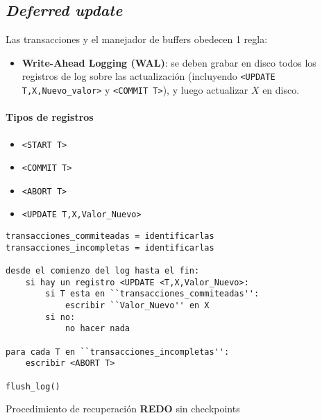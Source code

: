 \documentclass[a4paper, twoside]{article}
\begin{document}
\subsection{\emph{Deferred update}}
Las transacciones y el manejador de buffers obedecen 1 regla:
\begin{itemize}
	\item \textbf{Write-Ahead Logging (WAL)}: se deben grabar en disco todos los registros de log sobre las actualización (incluyendo \texttt{<UPDATE T,X,Nuevo\_valor>} y \texttt{<COMMIT T>}), y luego actualizar $X$ en disco.
\end{itemize}

\paragraph{Tipos de registros}
\begin{itemize}
	\item \texttt{<START T>}
	\item \texttt{<COMMIT T>}
	\item \texttt{<ABORT T>}
	\item \texttt{<UPDATE T,X,Valor\_Nuevo>}
\end{itemize}

\begin{algorithm}[H]
	\begin{lstlisting}
transacciones_commiteadas = identificarlas
transacciones_incompletas = identificarlas

desde el comienzo del log hasta el fin:
	si hay un registro <UPDATE <T,X,Valor_Nuevo>:
		si T esta en ``transacciones_commiteadas'':
			escribir ``Valor_Nuevo'' en X
		si no:
			no hacer nada

para cada T en ``transacciones_incompletas'':
	escribir <ABORT T>

flush_log()
	\end{lstlisting}
	\caption{Procedimiento de recuperación \textbf{REDO }sin checkpoints}
\end{algorithm}
\end{document}
